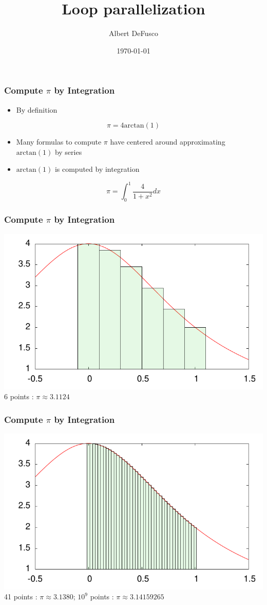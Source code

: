 \documentclass[xcolor=table,10pt,final]{beamer}
\begin{document}
\title{Loop parallelization}
\author{Albert DeFusco}
\date{\today}
\frame{\titlepage}

\begin{frame}
  \frametitle{Compute $\pi$ by Integration}
  \begin{itemize}
    \item By definition
  \end{itemize}
  \begin{equation}
    \pi = 4 \mathrm{arctan}(1)
  \end{equation}
  \begin{itemize}
    \itemsep 0.5cm
    \item Many formulas to compute $\pi$ have centered around approximating $\mathrm{arctan}(1)$ by series
    \item $\mathrm{arctan}(1)$ is computed by integration
  \end{itemize}
  \begin{equation}
    \pi = \int_0^1 \frac{4}{1+x^2} dx
  \end{equation}
\end{frame}


\begin{frame}
  \frametitle{Compute $\pi$ by Integration}
  \includegraphics[width=\textwidth]{figures/integrate}\\
  6 points : $\pi \approx 3.1124$
\end{frame}
\begin{frame}
  \frametitle{Compute $\pi$ by Integration}
  \includegraphics[width=\textwidth]{figures/integrate2}\\
  41 points : $\pi \approx 3.1380$; $10^9$ points : $\pi \approx 3.14159265$
\end{frame}
\end{document}
